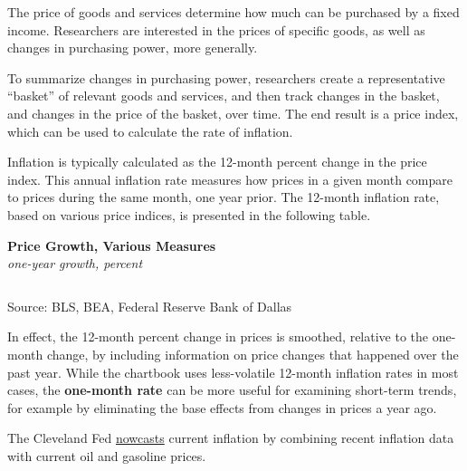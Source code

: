 \documentclass{report}
\begin{document}
{\begin{minipage}{1.0\textwidth}
\small The price of goods and services determine how much can be purchased by a fixed income. Researchers are interested in the prices of specific goods, as well as changes in purchasing power, more generally.

To summarize changes in purchasing power, researchers create a representative ``basket'' of relevant goods and services, and then track changes in the basket, and changes in the price of the basket, over time. The end result is a price index, which can be used to calculate the rate of inflation.

Inflation is typically calculated as the 12-month percent change in the price index. This annual inflation rate measures how prices in a given month compare to prices during the same month, one year prior. The 12-month inflation rate, based on various price indices, is presented in the following table. 
\vspace{1mm}

\normalsize \textbf{Price Growth, Various Measures}\\
\footnotesize{\textit{one-year growth, percent}}
\vspace*{-4mm}

\hspace*{-2mm}  \setlength{\tabcolsep}{3.1pt} \color{black!90}
	{\renewcommand{\arraystretch}{1.5}
		\begin{tabular}{p{30mm} R{7.6mm} R{7.6mm} R{7.6mm} R{7.6mm} R{7.6mm} R{7.6mm} 
		   R{9.2mm} R{8.5mm}}
			  \hline
		\end{tabular}}\vspace{-1mm}
		
\footnotesize{Source: BLS, BEA, Federal Reserve Bank of Dallas}
\vspace{2mm}

\small In effect, the 12-month percent change in prices is smoothed, relative to the one-month change, by including information on price changes that happened over the past year. While the chartbook uses less-volatile 12-month inflation rates in most cases, the \textbf{one-month rate} can be more useful for examining short-term trends, for example by eliminating the base effects from changes in prices a year ago. 

 The Cleveland Fed \href{https://www.clevelandfed.org/indicators-and-data/inflation-nowcasting}{nowcasts} current inflation by combining recent inflation data with current oil and gasoline prices. 
\vspace{1mm} \hypertarget{cpimm}{}


\end{minipage}}
\end{document}

